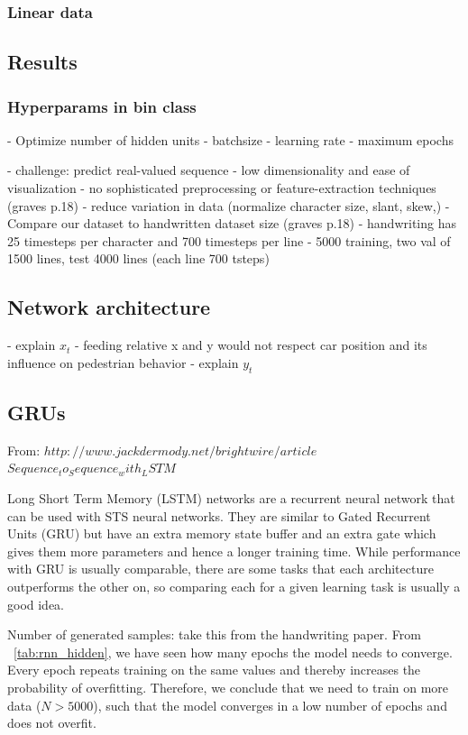 \begin{table}[]
\subsubsection{Linear data}

\subsection{Results}



\subsubsection{Hyperparams in bin class}
- Optimize number of hidden units
- batchsize
- learning rate
- maximum epochs


 


- challenge: predict real-valued sequence
- low dimensionality and ease of visualization
- no sophisticated preprocessing or feature-extraction techniques (graves p.18)
	- reduce variation in data (normalize character size, slant, skew,)
- Compare our dataset to handwritten dataset size (graves p.18)
- handwriting has 25 timesteps per character and 700 timesteps per line
- 5000 training, two val of 1500 lines, test 4000 lines (each line 700 tsteps)

\subsection{Network architecture}
- explain $x_t$
	- feeding relative x and y would not respect car position and its influence on pedestrian behavior
- explain $y_t$

\subsection{GRUs}
From: $http://www.jackdermody.net/brightwire/article$
$Sequence_to_Sequence_with_LSTM$

Long Short Term Memory (LSTM) networks are a recurrent neural network that can be used with STS neural networks. They are similar to Gated Recurrent Units (GRU) but have an extra memory state buffer and an extra gate which gives them more parameters and hence a longer training time. While performance with GRU is usually comparable, there are some tasks that each architecture outperforms the other on, so comparing each for a given learning task is usually a good idea.


Number of generated samples: take this from the handwriting paper.
From ~\cref{tab:rnn_hidden}, we have seen how many epochs the model needs to converge. Every epoch repeats training on the same values and thereby increases the probability of overfitting. Therefore, we conclude that we need to train on more data ($N > 5000$), such that the model converges in a low number of epochs and does not overfit.


\end{table}
